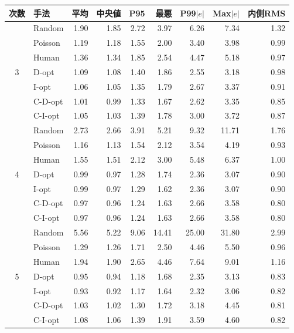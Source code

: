 \begin{tabular}{clrrrrrrr}
\toprule
次数 & 手法 & 平均 & 中央値 & P95 & 最悪 & P99$|e|$ & Max$|e|$ & 内側RMS \\
\midrule
\multirow{7}{*}{3} & Random & 1.90 & 1.85 & 2.72 & 3.97 & 6.26 & 7.34 & 1.32 \\
 & Poisson & 1.19 & 1.18 & 1.55 & 2.00 & 3.40 & 3.98 & 0.99 \\
 & Human & 1.36 & 1.34 & 1.85 & 2.54 & 4.47 & 5.18 & 0.97 \\
 & D-opt & 1.09 & 1.08 & 1.40 & 1.86 & 2.55 & 3.18 & 0.98 \\
 & I-opt & 1.06 & 1.05 & 1.35 & 1.79 & 2.67 & 3.37 & 0.91 \\
 & C-D-opt & 1.01 & 0.99 & 1.33 & 1.67 & 2.62 & 3.35 & 0.85 \\
 & C-I-opt & 1.05 & 1.03 & 1.39 & 1.78 & 3.00 & 3.72 & 0.87 \\
\midrule
\multirow{7}{*}{4} & Random & 2.73 & 2.66 & 3.91 & 5.21 & 9.32 & 11.71 & 1.76 \\
 & Poisson & 1.16 & 1.13 & 1.54 & 2.12 & 3.54 & 4.19 & 0.93 \\
 & Human & 1.55 & 1.51 & 2.12 & 3.00 & 5.48 & 6.37 & 1.00 \\
 & D-opt & 0.99 & 0.97 & 1.28 & 1.74 & 2.36 & 3.07 & 0.90 \\
 & I-opt & 0.99 & 0.97 & 1.29 & 1.62 & 2.36 & 3.07 & 0.90 \\
 & C-D-opt & 0.97 & 0.96 & 1.24 & 1.63 & 2.66 & 3.58 & 0.80 \\
 & C-I-opt & 0.97 & 0.96 & 1.24 & 1.63 & 2.66 & 3.58 & 0.80 \\
\midrule
\multirow{7}{*}{5} & Random & 5.56 & 5.22 & 9.06 & 14.41 & 25.00 & 31.80 & 2.99 \\
 & Poisson & 1.29 & 1.26 & 1.71 & 2.50 & 4.46 & 5.50 & 0.96 \\
 & Human & 1.94 & 1.90 & 2.65 & 4.46 & 7.64 & 9.01 & 1.16 \\
 & D-opt & 0.95 & 0.94 & 1.18 & 1.68 & 2.35 & 3.13 & 0.83 \\
 & I-opt & 0.93 & 0.92 & 1.17 & 1.64 & 2.32 & 3.06 & 0.82 \\
 & C-D-opt & 1.03 & 1.02 & 1.30 & 1.72 & 3.18 & 4.45 & 0.81 \\
 & C-I-opt & 1.08 & 1.06 & 1.39 & 1.91 & 3.59 & 4.60 & 0.82 \\
\bottomrule
\end{tabular}

